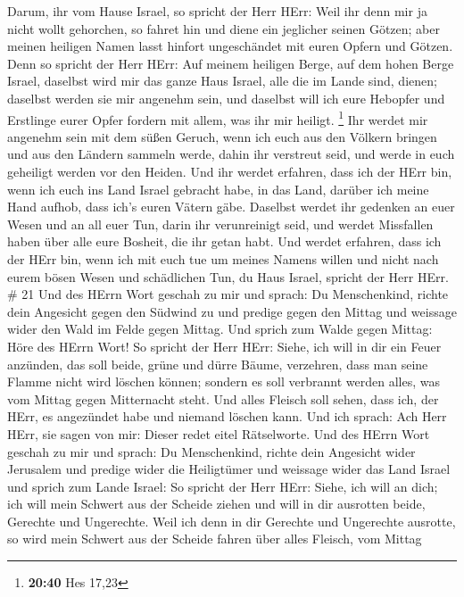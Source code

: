  Darum, ihr vom Hause Israel, so spricht der Herr HErr:
Weil ihr denn mir ja nicht wollt gehorchen, so fahret hin und diene ein
jeglicher seinen Götzen; aber meinen heiligen Namen lasst hinfort
ungeschändet mit euren Opfern und Götzen.  Denn so spricht
der Herr HErr: Auf meinem heiligen Berge, auf dem hohen Berge Israel,
daselbst wird mir das ganze Haus Israel, alle die im Lande sind, dienen;
daselbst werden sie mir angenehm sein, und daselbst will ich eure
Hebopfer und Erstlinge eurer Opfer fordern mit allem, was ihr mir
heiligt. \footnote{\textbf{20:40} Hes 17,23}  Ihr werdet
mir angenehm sein mit dem süßen Geruch, wenn ich euch aus den Völkern
bringen und aus den Ländern sammeln werde, dahin ihr verstreut seid, und
werde in euch geheiligt werden vor den Heiden.  Und ihr
werdet erfahren, dass ich der HErr bin, wenn ich euch ins Land Israel
gebracht habe, in das Land, darüber ich meine Hand aufhob, dass ich's
euren Vätern gäbe.  Daselbst werdet ihr gedenken an euer
Wesen und an all euer Tun, darin ihr verunreinigt seid, und werdet
Missfallen haben über alle eure Bosheit, die ihr getan habt.
 Und werdet erfahren, dass ich der HErr bin, wenn ich mit
euch tue um meines Namens willen und nicht nach eurem bösen Wesen und
schädlichen Tun, du Haus Israel, spricht der Herr HErr. \# 21
 Und des HErrn Wort geschah zu mir und sprach: 
Du Menschenkind, richte dein Angesicht gegen den Südwind zu und predige
gegen den Mittag und weissage wider den Wald im Felde gegen Mittag.
 Und sprich zum Walde gegen Mittag: Höre des HErrn Wort! So
spricht der Herr HErr: Siehe, ich will in dir ein Feuer anzünden, das
soll beide, grüne und dürre Bäume, verzehren, dass man seine Flamme
nicht wird löschen können; sondern es soll verbrannt werden alles, was
vom Mittag gegen Mitternacht steht.  Und alles Fleisch soll
sehen, dass ich, der HErr, es angezündet habe und niemand löschen kann.
 Und ich sprach: Ach Herr HErr, sie sagen von mir: Dieser
redet eitel Rätselworte.  Und des HErrn Wort geschah zu mir
und sprach:  Du Menschenkind, richte dein Angesicht wider
Jerusalem und predige wider die Heiligtümer und weissage wider das Land
Israel  und sprich zum Lande Israel: So spricht der Herr
HErr: Siehe, ich will an dich; ich will mein Schwert aus der Scheide
ziehen und will in dir ausrotten beide, Gerechte und Ungerechte.
 Weil ich denn in dir Gerechte und Ungerechte ausrotte, so
wird mein Schwert aus der Scheide fahren über alles Fleisch, vom Mittag

